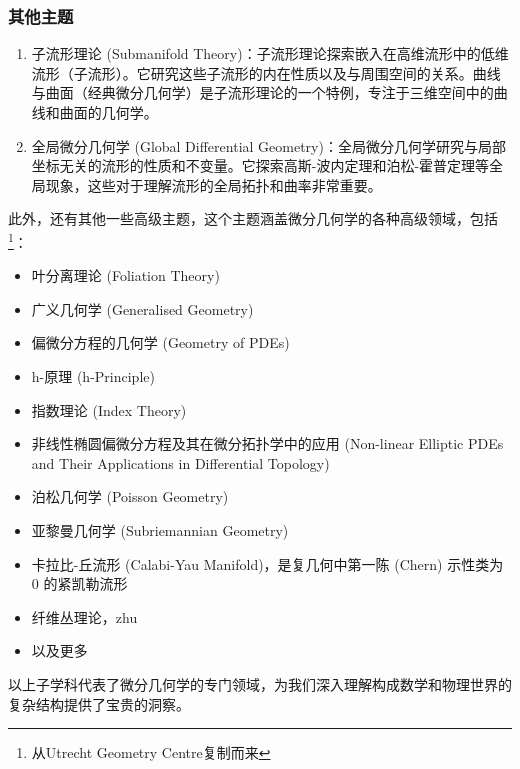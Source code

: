 \subsubsection{其他主题}

\begin{enumerate}
\item 子流形理论 (Submanifold Theory)：子流形理论探索嵌入在高维流形中的低维流形（子流形）。它研究这些子流形的内在性质以及与周围空间的关系。曲线与曲面（经典微分几何学）是子流形理论的一个特例，专注于三维空间中的曲线和曲面的几何学。

\item 全局微分几何学 (Global Differential Geometry)：全局微分几何学研究与局部坐标无关的流形的性质和不变量。它探索高斯-波内定理和泊松-霍普定理等全局现象，这些对于理解流形的全局拓扑和曲率非常重要。
\end{enumerate}


此外，还有其他一些高级主题，这个主题涵盖微分几何学的各种高级领域，包括\footnote{从Utrecht Geometry Centre复制而来}：

\begin{itemize}
\item 叶分离理论 (Foliation Theory)
\item 广义几何学 (Generalised Geometry)
\item 偏微分方程的几何学 (Geometry of PDEs)
\item h-原理 (h-Principle)
\item 指数理论 (Index Theory)
\item 非线性椭圆偏微分方程及其在微分拓扑学中的应用 (Non-linear Elliptic PDEs and Their Applications in Differential Topology)
\item 泊松几何学 (Poisson Geometry)
\item 亚黎曼几何学 (Subriemannian Geometry)
\item 卡拉比-丘流形 (Calabi-Yau Manifold)，是复几何中第一陈 (Chern) 示性类为 $0$ 的紧凯勒流形
\item 纤维丛理论，zhu
\item 以及更多
\end{itemize}

以上子学科代表了微分几何学的专门领域，为我们深入理解构成数学和物理世界的复杂结构提供了宝贵的洞察。

